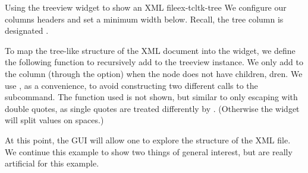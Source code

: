 \begin{example}{Using the treeview widget to show an XML file}{ex-tcltk-tree}
We configure our columns headers and set a minimum
width below. Recall, the tree column is designated .
\begin{Schunk}
\end{Schunk}

To map the tree-like structure of the XML document into the widget, we
define the following function to recursively add to the treeview
instance.  We only add to the  column (through the
 option) when the node does not have children, dren. We
use , as a convenience, to avoid constructing two
different calls to the  subcommand. The 
function used is not shown, but similar to  only
escaping with double quotes, as single quotes are treated differently
by \TCL. (Otherwise the  widget will split values on
spaces.)
\begin{Schunk}
\end{Schunk}

At this point, the GUI will allow one to explore the structure of the
XML file. We continue this example to show two things of general
interest, but are really artificial for this example.



\end{example}
